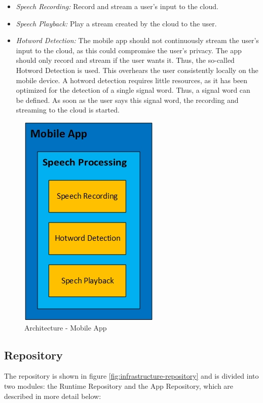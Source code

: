\begin{itemize}
	\item \textsl{Speech Recording:} Record and stream a user's input to the cloud.
	\item \textsl{Speech Playback:} Play a stream created by the cloud to the user.
	\item \textsl{Hotword Detection:} The mobile app should not continuously stream the user's input to the cloud, as this could compromise the user's privacy. The app should only record and stream if the user wants it. Thus, the so-called \glqq Hotword Detection\grqq{} is used. This overhears the user consistently locally on the mobile device. A hotword detection requires little resources, as it has been optimized for the detection of a single signal word. Thus, a signal word can be defined. As soon as the user says this signal word, the recording and streaming to the cloud is started.
\end{itemize}

\begin{figure}[h!]
	\centering
	\includegraphics[width=0.3\linewidth]{Picture/Infrastruktur-App.jpg}
	\caption[Architecture - Mobile App]{Architecture - Mobile App}
	\label{fig:infrastructure-app}
\end{figure}

\subsection{Repository}
The repository is shown in figure \ref{fig:infrastructure-repository} and is divided into two modules: the Runtime Repository and the App Repository, which are described in more detail below:

